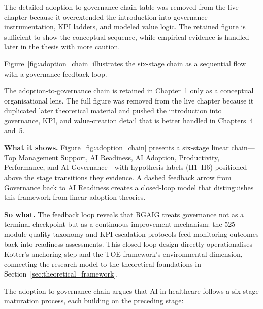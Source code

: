\label{tab:adoption_chain}

\noindent The detailed adoption-to-governance chain table was removed from the live chapter because it overextended the introduction into governance instrumentation, KPI ladders, and modeled value logic. The retained figure is sufficient to show the conceptual sequence, while empirical evidence is handled later in the thesis with more caution.

Figure~\ref{fig:adoption_chain} illustrates the six-stage chain as a sequential flow with a governance feedback loop.


\label{fig:adoption_chain}

\noindent The adoption-to-governance chain is retained in Chapter~1 only as a conceptual organisational lens. The full figure was removed from the live chapter because it duplicated later theoretical material and pushed the introduction into governance, KPI, and value-creation detail that is better handled in Chapters~4 and~5.

\iffalse %

\noindent\textbf{What it shows.} Figure~\ref{fig:adoption_chain} presents a six-stage linear chain---Top Management Support, AI Readiness, AI Adoption, Productivity, Performance, and AI Governance---with hypothesis labels (H1--H6) positioned above the stage transitions they evidence. A dashed feedback arrow from Governance back to AI Readiness creates a closed-loop model that distinguishes this framework from linear adoption theories.


\noindent\textbf{So what.} The feedback loop reveals that RGAIG treats governance not as a terminal checkpoint but as a continuous improvement mechanism: the 525-module quality taxonomy and KPI escalation protocols feed monitoring outcomes back into readiness assessments. This closed-loop design directly operationalises Kotter's anchoring step and the TOE framework's environmental dimension, connecting the research model to the theoretical foundations in Section~\ref{sec:theoretical_framework}.

The adoption-to-governance chain argues that AI in healthcare follows a six-stage maturation process, each building on the preceding stage:

